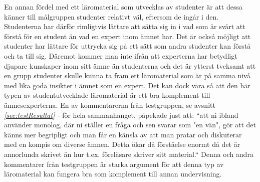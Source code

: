 \documentclass[12pt,a4paper,twoside,openright]{article}
\begin{document}
En annan fördel med ett läromaterial som utvecklas av studenter
är att dessa känner till målgruppen studenter relativt väl,
eftersom de ingår i den. Studenterna har därför rimligtvis lättare
att sätta sig in i vad som är svårt att förstå för en student
än vad en expert inom ämnet har. Det är också möjligt att studenter
har lättare för uttrycka sig på ett sätt som andra studenter
kan förstå och ta till sig. Däremot kommer man inte ifrån
att experterna har betydligt djupare kunskaper inom sitt ämne
än studenterna och det är ytterst tveksamt att en grupp studenter
skulle kunna ta fram ett läromaterial som är på samma nivå med
lika goda insikter i ämnet som en expert. Det kan dock vara så
att den här typen av studentutvecklade läromaterial är ett bra
komplement till ämnesexperterna. En av kommentarerna från
testgruppen, se avsnitt \textit{\ref{sec:testResultat} - } för hela sammanhanget,
påpekade just att: “att ni ibland använder monolog, där ni
ställer en fråga och sen svarar som "en vän", gör
att det känns mer begripligt och man får en känsla av att man
pratar och diskuterar med en kompis om diverse ämnen. Detta
ökar då förståelse enormt då det är annorlunda skrivet än hur
t.ex. föreläsare skriver sitt material.“ Denna och andra
kommentarer från testgruppen är starka argument för att denna typ av
läromaterial kan fungera bra som komplement till annan
undervisning.


\end{document}

